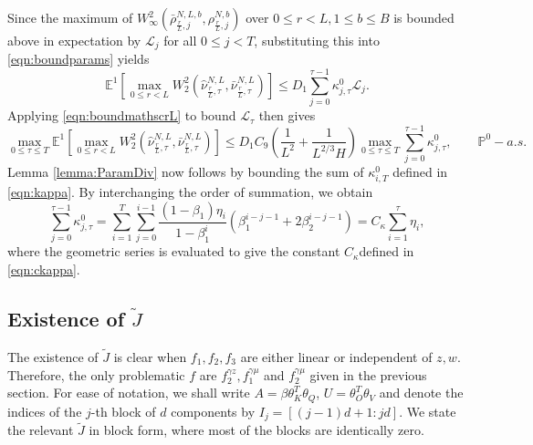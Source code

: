 \documentclass{article}
\newcommand{\E}{\mathbb{E}}
\begin{document}
\begin{appendices}
 Since the maximum of $W^2_{\infty}(\bar\rho^{N,L,b}_{\frac{r}{L},j},\rho^{N,b}_{\frac{r}{L},j})$ over $0\le r < L, 1\le b \le B$ is bounded above in expectation by $\mathscr{L}_j$ for all $0\le j<T$, substituting this into \eqref{eqn:boundparams} yields
\[
\E^1\left[\max_{0\le r < L}W_2^2(\hat \nu^{N,L}_{\frac{r}{L},\tau},\bar \nu^{N,L}_{\frac{r}{L},\tau})\right]\le D_1\sum_{j=0}^{\tau-1}\kappa^0_{j,\tau}\mathscr{L}_j.
\]
Applying \eqref{eqn:boundmathscrL} to bound $\mathscr{L}_\tau$ then gives
\[
\max_{0\le \tau\le T}\E^1\left[\max_{0\le r< L} W_2^2(\hat \nu^{N,L}_{\frac{r}{L},\tau},\bar \nu^{N,L}_{\frac{r}{L},\tau})\right]\le D_1C_9\left(\frac{1}{L^2}+\frac{1}{L^{2/3}H}\right) \max_{0\le \tau \le T}\sum_{j=0}^{\tau-1}\kappa^0_{j,\tau}, \qquad \mathbb P^0-a.s.
\]
Lemma \ref{lemma:ParamDiv} now follows by bounding the sum of $\kappa^0_{i,T}$ defined in \eqref{eqn:kappa}. By interchanging the order of summation, we obtain
\[
\sum_{j=0}^{\tau-1}\kappa^0_{j,\tau} = \sum_{i=1}^T\sum_{j=0}^{i-1}\frac{(1-\beta_1)\eta_i}{1-\beta_1^i}(\beta_1^{i-j-1}+2\beta_2^{i-j-1})= C_\kappa\sum_{i=1}^\tau\eta_i,
\]
where the geometric series is evaluated to give the constant $C_\kappa$defined in \eqref{eqn:ckappa}.
\subsection{Existence of $\widetilde{J}$}\label{sec:Jtilde}
The existence of $\widetilde{J}$ is clear when $f_1,f_2,f_3$ are either linear or independent of $z,w$. Therefore, the only problematic $f$ are $f^{\gamma z}_2, f_1^{\gamma\mu}$ and $f^{\gamma\mu}_2$ given in the previous section. For ease of notation, we shall write $A=\beta \theta_K^T\theta_Q$, $U=\theta_O^T\theta_V$ and denote the indices of the $j$-th block of $d$ components by $I_j=[(j-1)d+1:jd]$. We state the relevant $\widetilde J$ in block form, where most of the blocks are identically zero.


\end{appendices}
\end{document}
